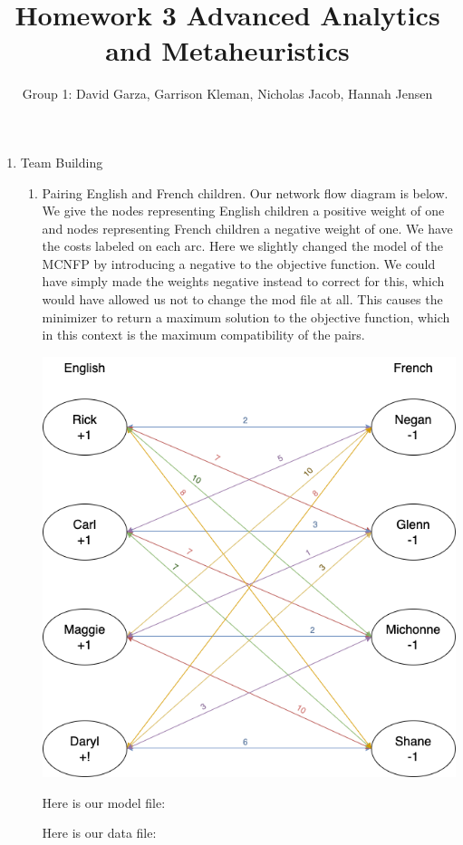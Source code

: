 \documentclass[11pt]{article}
\author{Group 1:  David Garza,  Garrison Kleman, Nicholas Jacob, Hannah Jensen}
\title{Homework 3 Advanced Analytics and Metaheuristics}
\begin{document}
\maketitle

\begin{enumerate}
\item Team Building
\begin{enumerate}
\item Pairing English and French children.  Our network flow diagram is below. We give the nodes representing English children a positive weight of one and nodes representing French children a negative weight of one.  We have the costs labeled on each arc.  Here we slightly changed the model of the MCNFP by introducing a negative to the objective function.  We could have simply made the weights negative instead to correct for this, which would have allowed us not to change the mod file at all.  This causes the minimizer to return a maximum solution to the objective function, which in this context is the maximum compatibility of the pairs.

\includegraphics[width = .9\textwidth]{p1a_flow_diagram.png}

Here is our model file:

{\small {}}

Here is our data file:

{\small {}}


\end{enumerate}
\end{enumerate}
\end{document}
